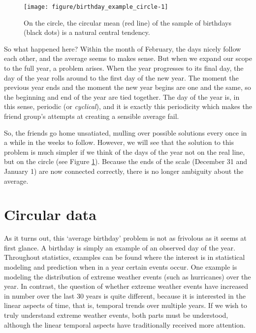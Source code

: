 \documentclass[12pt, a4paper]{book}\usepackage[]{graphicx}\usepackage{xcolor}
\makeatletter
\def\maxwidth{ %
  \ifdim\Gin@nat@width>\linewidth
    \linewidth
  \else
    \Gin@nat@width
  \fi
}
\newenvironment{knitrout}{}{} %
\makeatother
\begin{document}
\begin{figure}
\begin{knitrout}
\color{fgcolor}
\texttt{[image: figure/birthday\_example\_circle-1]} 

\end{knitrout}
\caption{On the circle, the circular mean (red line) of the sample of birthdays (black dots)  is a natural central tendency.}
\label{birthday_example_circle}
\end{figure}



So what happened here? Within the month of February, the days nicely follow each other, and the average seems to makes sense. But when we expand our scope to the full year, a problem arises. When the year progresses to its final day, the day of the year rolls around to the first day of the new year. The moment the previous year ends and the moment the new year begins are one and the same, so the beginning and end of the year are tied together. The day of the year is, in this sense, periodic (or \textit{cyclical}), and it is exactly this periodicity which makes the friend group's attempts at creating a sensible average fail.

So, the friends go home unsatiated, mulling over possible solutions every once in a while in the weeks to follow. However, we will see that the solution to this problem is much simpler if we think of the days of the year not on the real line, but on the circle (see Figure \ref{birthday_example_circle}). Because the ends of the scale (December 31 and January 1) are now connected correctly, there is no longer ambiguity about the average.


\section*{Circular data}

As it turns out, this `average birthday' problem is not as frivolous as it seems at first glance.  A birthday is simply an example of an observed day of the year. Throughout statistics, examples can be found where the interest is in statistical modeling and prediction when in a year certain events occur. One example is modeling the distribution of extreme weather events (such as hurricanes) over the year. In contrast, the question of whether extreme weather events have increased in number over the last 30 years is quite different, because it is interested in the linear aspects of time, that is, temporal trends over multiple years. If we wish to truly understand extreme weather events, both parts must be understood, although the linear temporal aspects have traditionally received more attention.
\end{document}
